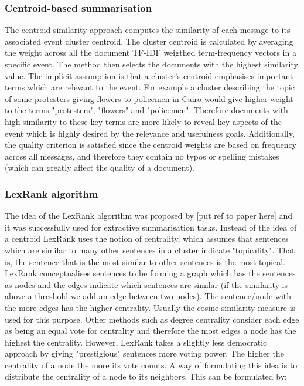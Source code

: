 \subsubsection{Centroid-based summarisation}
The centroid similarity approach computes the similarity of each message to its associated event cluster centroid. The cluster centroid is calculated by averaging the weight across all the document TF-IDF weigthed term-frequency vectors in a specific event. The method then selects the documents with the highest similarity value. The implicit assumption is that a cluster’s centroid emphasises important terms which are relevant to the event. For example a cluster describing the topic of some protesters giving flowers to policemen in Cairo would give higher weight to the terms "protesters", "flowers" and "policemen". Therefore documents with high similarity to these key terms are more likely to reveal key aspects of the event which is highly desired by the relevance and usefulness goals. Additionally, the quality criterion is satisfied since the centroid weights are based on frequency across all messages, and therefore they contain no typos or spelling mistakes (which can greatly affect the quality of a document). 

\subsubsection{LexRank algorithm}
The idea of the LexRank algorithm was proposed by [put ref to paper here] and it was successfully used for extractive summarisation tasks. Instead of the idea of a centroid LexRank uses the notion of centrality, which
assumes that sentences which are similar to many other sentences in a cluster indicate "topicality". That is, the
sentence that is the most similar to other sentences is the most topical. LexRank conceptualises sentences to be forming a graph which has the sentences as nodes and the edges indicate which sentences are similar (if the similarity is above a threshold we add an edge between two nodes). The sentence/node with the more edges has the higher centrality. Usually the cosine similarity measure is used for this purpose. Other methods such as degree centrality consider each edge as being an equal vote for centrality and therefore the most edges a node has the highest the centrality. However, LexRank takes a slightly less democratic approach by giving "prestigious" sentences more voting power. The higher the centrality of a node the more its vote counts. A way of formulating this idea is to distribute the centrality of a node to its neighbors. This can be formulated by:

